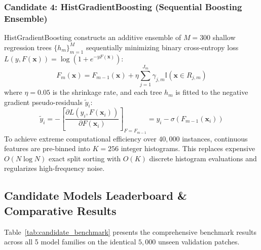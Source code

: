 \documentclass[11pt,a4paper]{article}
\begin{document}
\subsubsection{Candidate 4: HistGradientBoosting (Sequential Boosting Ensemble)}
HistGradientBoosting constructs an additive ensemble of $M=300$ shallow regression trees $\{h_m\}_{m=1}^M$ sequentially minimizing binary cross-entropy loss $L(y, F(\mathbf{x})) = \log(1 + e^{-y F(\mathbf{x})})$:
\begin{equation}
    F_m(\mathbf{x}) = F_{m-1}(\mathbf{x}) + \eta \sum_{j=1}^{J_m} \gamma_{j,m} \mathbb{I}(\mathbf{x} \in R_{j,m})
\end{equation}
where $\eta = 0.05$ is the shrinkage rate, and each tree $h_m$ is fitted to the negative gradient pseudo-residuals $\tilde{y}_i$:
\begin{equation}
    \tilde{y}_i = -\left[\frac{\partial L(y_i, F(\mathbf{x}_i))}{\partial F(\mathbf{x}_i)}\right]_{F=F_{m-1}} = y_i - \sigma(F_{m-1}(\mathbf{x}_i))
\end{equation}
To achieve extreme computational efficiency over $40,000$ instances, continuous features are pre-binned into $K=256$ integer histograms. This replaces expensive $O(N \log N)$ exact split sorting with $O(K)$ discrete histogram evaluations and regularizes high-frequency noise.

\subsection{Candidate Models Leaderboard \& Comparative Results}

Table~\ref{tab:candidate_benchmark} presents the comprehensive benchmark results across all 5 model families on the identical $5,000$ unseen validation patches.
\end{document}
